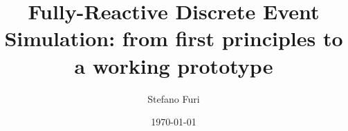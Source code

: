 \documentclass[12pt,a4paper,openright,twoside]{book}
\title{Fully-Reactive Discrete Event Simulation: from first principles to a working prototype}
\author{Stefano Furi}
\date{\today}
\begin{document}
\frontmatter\frontispiece


\tableofcontents

\mainmatter







\backmatter

\listoffigures
\listofalgorithms
\listoflistings



\end{document}
